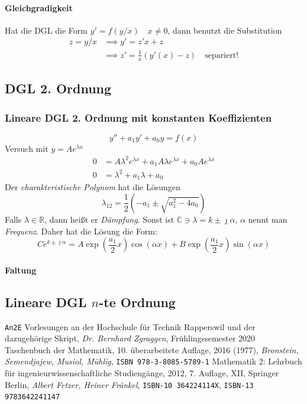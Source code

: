 \documentclass[margin=small, twocolumn]{hsrzf}
\numberwithin{equation}{subsection}
\begin{document}
\paragraph{Gleichgradigkeit} Hat die DGL die Form \(y' = f(y/x) \quad x \neq 0\), dann benutzt die Substitution
\begin{align*}
    z = y/x &\implies y' = z'x + z \\
    &\implies z' = \frac{1}{x}\left(y'(x) - z\right) \quad\text{separiert!}
\end{align*}



\subsection{DGL 2. Ordnung}

\subsubsection{Lineare DGL 2. Ordnung mit konstanten Koeffizienten}
\[
    y'' + a_1 y' + a_0 y = f(x)
\]
Versuch mit \(y = Ae^{\lambda x}\)
\begin{align*}
    0 &= A\lambda^2 e^{\lambda x} + a_1 A \lambda e^{\lambda x} + a_0 A e^{\lambda x} \\
    0 &= \lambda^2 + a_1\lambda + a_0
\end{align*}
Der \emph{charakteristische Polynom} hat die L\"osungen
\[
    \lambda_{12} = \frac{1}{2}\left(-a_1 \pm \sqrt{a_1^2 - 4a_0}\right)
\]
Falls \(\lambda \in \mathbb{R}\), dann hei{\ss}t er \emph{D\"ampfung}. Sonst ist \(\mathbb{C} \ni \lambda = k \pm\jmath\alpha\), \(\alpha\) nennt man \emph{Frequenz}. Daher hat die L\"osung die Form:
\[
    Ce^{k\pm\jmath\alpha} 
    = A\exp\left(\frac{a_1}{2}x\right)\cos(\alpha x)
    + B\exp\left(\frac{a_1}{2}x\right)\sin(\alpha x)
\]

\paragraph{Faltung}

\subsection{Lineare DGL \(n\)-te Ordnung}


\begin{thebibliography}{3}
    \texttt{An2E} Vorlesungen an der Hochschule f\"ur Technik Rapperswil und der dazugeh\"orige Skript,
    \textit{Dr. Bernhard Zgraggen}, Fr\"uhlingssemester 2020
    Taschenbuch der Mathematik,
    10. \"uberarbeitete Auflage, 2016 (1977),
    \textit{Bronstein, Semendjajew, Musiol, M\"uhlig}, 
    \texttt{ISBN 978-3-8085-5789-1}
    Mathematik 2: Lehrbuch für ingenieurwissenschaftliche Studieng\"ange,
    2012, 7. Auflage, XII, Springer Berlin,
    \textit{Albert Fetzer, Heiner Fränkel},
    \texttt{ISBN-10 364224114X},
    \texttt{ISBN-13 9783642241147}
    
\end{thebibliography}
\end{document}
